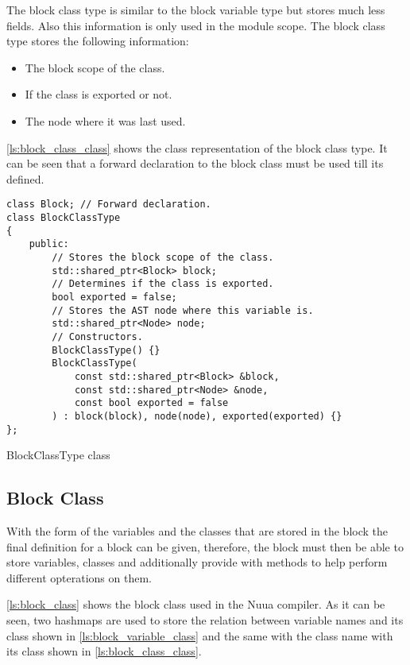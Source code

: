 The block class type is similar to the block variable type but stores much less fields. Also this information is only used in the module scope.
The block class type stores the following information:

\begin{itemize}
    \item The block scope of the class.
    \item If the class is exported or not.
    \item The node where it was last used.
\end{itemize}

\autoref{ls:block_class_class} shows the class representation of the block class type. It can be seen that a forward declaration to
the block class must be used till its defined.

\begin{listing}[H]
\begin{verbatim}
class Block; // Forward declaration.
class BlockClassType
{
    public:
        // Stores the block scope of the class.
        std::shared_ptr<Block> block;
        // Determines if the class is exported.
        bool exported = false;
        // Stores the AST node where this variable is.
        std::shared_ptr<Node> node;
        // Constructors.
        BlockClassType() {}
        BlockClassType(
            const std::shared_ptr<Block> &block,
            const std::shared_ptr<Node> &node,
            const bool exported = false
        ) : block(block), node(node), exported(exported) {}
};
\end{verbatim}
\caption{BlockClassType class}
\label{ls:block_class_class}
\end{listing}

\subsection{Block Class}

With the form of the variables and the classes that are stored in the block the final definition for a block can be given, therefore, the block must
then be able to store variables, classes and additionally provide with methods to help perform different opterations on them.

\autoref{ls:block_class} shows the block class used in the Nuua compiler. As it can be seen, two hashmaps are used to store the relation between
variable names and its class shown in \autoref{ls:block_variable_class} and the same with the class name with its class shown in \autoref{ls:block_class_class}.

